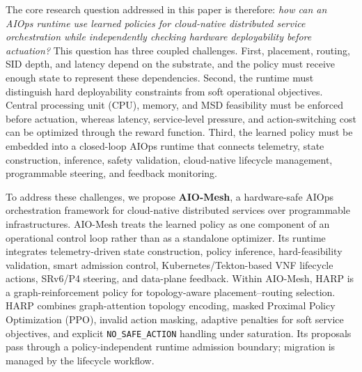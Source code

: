 \documentclass[final,5p]{elsarticle}
\newcommand{\rev}[1]{\textcolor{revisiongreen}{#1}}
\let\newrev\rev
\begin{document}
The core research question addressed in this paper is therefore: \rev{\emph{how can an AIOps runtime use learned policies for cloud-native distributed service orchestration while independently checking hardware deployability before actuation?}} This question has three coupled challenges. First, \newrev{placement, routing, SID depth, and latency depend on the substrate, and the policy must receive enough state to represent these dependencies.} Second, the runtime must distinguish hard deployability constraints from soft operational objectives. \newrev{Central processing unit (CPU), memory, and MSD feasibility} must be enforced before actuation, whereas latency, service-level pressure, and \rev{action-switching cost} can be optimized through the reward function. Third, the learned policy must be embedded into a closed-loop AIOps runtime that connects telemetry, state construction, inference, safety validation, cloud-native lifecycle management, programmable steering, and feedback monitoring.

To address these challenges, we propose \textbf{AIO-Mesh}, a hardware-safe AIOps orchestration framework for cloud-native distributed services over programmable infrastructures. AIO-Mesh treats the learned policy as one component of an operational control loop rather than as a standalone optimizer. Its runtime integrates telemetry-driven state construction, policy inference, hard-feasibility validation, smart admission control, Kubernetes/Tekton-based VNF lifecycle actions, SRv6/P4 steering, and data-plane feedback. \newrev{Within AIO-Mesh, HARP is a graph-reinforcement policy for topology-aware placement--routing selection}. HARP combines graph-attention topology encoding, \rev{masked Proximal Policy Optimization (PPO)}, invalid action masking, adaptive penalties for soft service objectives, and explicit \texttt{NO\_SAFE\_ACTION} handling under saturation. \rev{Its proposals pass through a policy-independent runtime admission boundary; migration is managed by the lifecycle workflow.}
\end{document}
